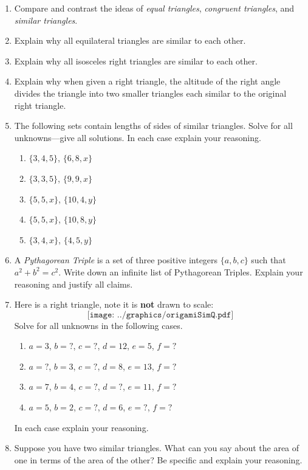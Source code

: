 \begin{problems}
\begin{enumerate}
\item Compare and contrast the ideas of \textit{equal triangles},
  \textit{congruent triangles}, and \textit{similar triangles}.
\item Explain why all equilateral triangles are similar to each other.
\item Explain why all isosceles right triangles are similar to each other. 
\item Explain why when given a right triangle, the altitude of the
  right angle divides the triangle into two smaller triangles each
  similar to the original right triangle.
\item The following sets contain lengths of sides of similar
  triangles. Solve for all unknowns---give all solutions. In each case
  explain your reasoning.
\begin{enumerate}
\item $\{3,4,5\}$, $\{6,8,x\}$
\item $\{3,3,5\}$, $\{9,9,x\}$
\item $\{5,5,x\}$, $\{10,4,y\}$
\item $\{5,5,x\}$, $\{10,8,y\}$
\item $\{3,4,x\}$, $\{4,5,y\}$ 
\end{enumerate}
\item A \textit{Pythagorean Triple} is a set
  of three positive integers $\{a,b,c\}$ such that $a^2 + b^2 =
  c^2$. Write down an infinite list of Pythagorean Triples. Explain
  your reasoning and justify all claims.
\item Here is a right triangle, note it is \textbf{not} drawn to
  scale:
\[
\texttt{[image: ../graphics/origamiSimQ.pdf]}
\]
Solve for all unknowns in the following cases.
\begin{enumerate}
\item $a = 3$, $b = ?$, $c = ?$, $d = 12$, $e = 5$, $f = ?$
\item $a = ?$, $b = 3$, $c = ?$, $d =8$, $e = 13$, $f = ?$
\item $a = 7$, $b = 4$, $c = ?$, $d =?$, $e = 11$, $f = ?$
\item $a = 5$, $b = 2$, $c = ?$, $d =6$, $e = ?$, $f = ?$
\end{enumerate}
In each case explain your reasoning.

\item Suppose you have two similar triangles. What can you say about
  the area of one in terms of the area of the other? Be specific and
  explain your reasoning.


\end{enumerate}
\end{problems}
